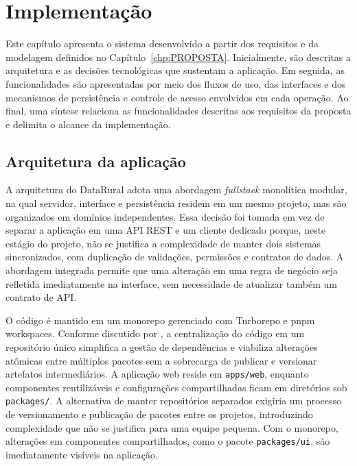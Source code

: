\chapter{Implementação}\label{chp:EXPERIMENTOS}

Este capítulo apresenta o sistema desenvolvido a partir dos requisitos e da modelagem definidos no Capítulo~\ref{chp:PROPOSTA}. Inicialmente, são descritas a arquitetura e as decisões tecnológicas que sustentam a aplicação. Em seguida, as funcionalidades são apresentadas por meio dos fluxos de uso, das interfaces e dos mecanismos de persistência e controle de acesso envolvidos em cada operação. Ao final, uma síntese relaciona as funcionalidades descritas aos requisitos da proposta e delimita o alcance da implementação.

\section{Arquitetura da aplicação}\label{sec:arquitetura}

A arquitetura do DataRural adota uma abordagem \textit{fullstack} monolítica modular, na qual servidor, interface e persistência residem em um mesmo projeto, mas são organizados em domínios independentes. Essa decisão foi tomada em vez de separar a aplicação em uma API REST e um cliente dedicado porque, neste estágio do projeto, não se justifica a complexidade de manter dois sistemas sincronizados, com duplicação de validações, permissões e contratos de dados. A abordagem integrada permite que uma alteração em uma regra de negócio seja refletida imediatamente na interface, sem necessidade de atualizar também um contrato de API.

O código é mantido em um monorepo gerenciado com Turborepo e pnpm workspaces. Conforme discutido por , a centralização do código em um repositório único simplifica a gestão de dependências e viabiliza alterações atômicas entre múltiplos pacotes sem a sobrecarga de publicar e versionar artefatos intermediários. A aplicação web reside em \texttt{apps/web}, enquanto componentes reutilizáveis e configurações compartilhadas ficam em diretórios sob \texttt{packages/}. A alternativa de manter repositórios separados exigiria um processo de versionamento e publicação de pacotes entre os projetos, introduzindo complexidade que não se justifica para uma equipe pequena. Com o monorepo, alterações em componentes compartilhados, como o pacote \texttt{packages/ui}, são imediatamente visíveis na aplicação.

